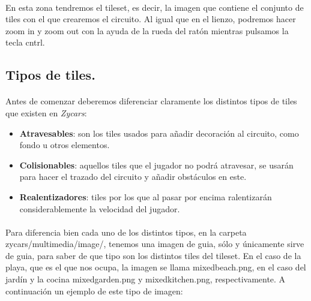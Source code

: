 \paragraph{}
En esta zona tendremos el tileset, es decir, la imagen que contiene el conjunto de tiles con el que crearemos el circuito.
Al igual que en el lienzo, podremos hacer zoom in y zoom out con la ayuda de la rueda del ratón mientras pulsamos la tecla
cntrl.

\subsection{Tipos de tiles.}

\paragraph{}
Antes de comenzar deberemos diferenciar claramente los distintos tipos de tiles que existen en \emph{Zycars}:

\begin{itemize}
    \item \textbf{Atravesables}: son los tiles usados para añadir decoración al circuito, como fondo u otros elementos.
    \item \textbf{Colisionables}: aquellos tiles que el jugador no podrá atravesar, se usarán para hacer el trazado del circuito
    y añadir obstáculos en este.
    \item \textbf{Realentizadores}: tiles por los que al pasar por encima
    ralentizarán considerablemente la velocidad del jugador.
\end{itemize}

\paragraph{}
Para diferencia bien cada uno de los distintos tipos, en la carpeta zycars/multimedia/image/, tenemos una imagen de guia, sólo
y únicamente sirve de guia, para saber de que tipo son los distintos tiles del tileset. En el caso de la playa, que es el que nos
ocupa, la imagen se llama mixedbeach.png, en el caso del jardín y la cocina mixedgarden.png y mixedkitchen.png, respectivamente.
A continuación un ejemplo de este tipo de imagen:

